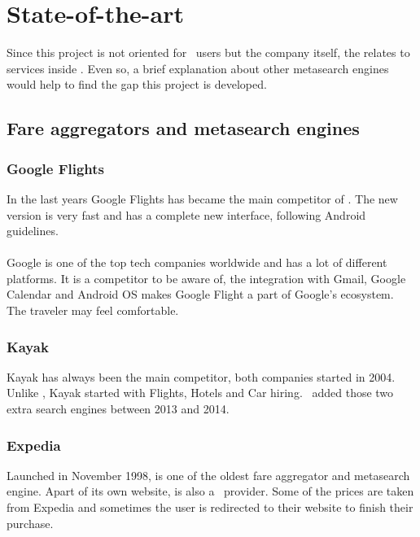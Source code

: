 
\chapter{State-of-the-art}

\label{chapter02}

Since this project is not oriented for \company\ users but the company itself, the \textit{} relates to services inside \company. Even so, a brief explanation about other metasearch engines would help to find the gap this project is developed.


\section{Fare aggregators and metasearch engines}

\subsection{Google Flights}

In the last years Google Flights has became the main competitor of \company. The new version is very fast and has a complete new interface, following Android guidelines.
\\\\
Google is one of the top tech companies worldwide and has a lot of different platforms. It is a competitor to be aware of, the integration with Gmail, Google Calendar and Android OS makes Google Flight a part of Google's ecosystem. The traveler may feel comfortable.

\subsection{Kayak}

Kayak has always been the main competitor, both companies started in 2004. Unlike \company, Kayak started with Flights, Hotels and Car hiring. \company\ added those two extra search engines between 2013 and 2014.

\subsection{Expedia}

Launched in November 1998, is one of the oldest fare aggregator and metasearch engine. Apart of its own website, is also a \company\ provider. Some of the prices are taken from Expedia and sometimes the user is redirected to their website to finish their purchase.

